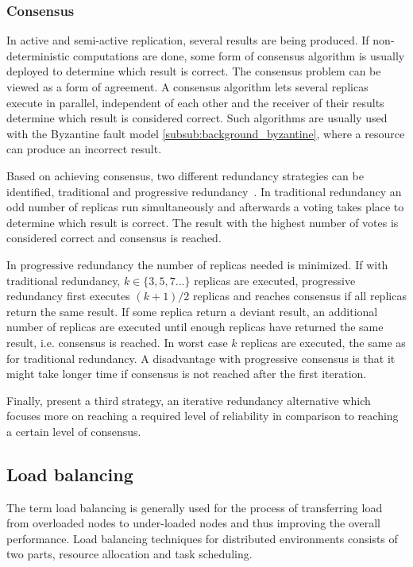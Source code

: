 \documentclass{cslthse-msc}
\begin{document}
\subsubsection{Consensus} \label{subsub:consensus}
In active and semi-active replication, several results are being produced. If non-deterministic computations are done, some form of consensus algorithm is usually deployed to determine which result is correct. The consensus problem can be viewed as a form of agreement. A consensus algorithm lets several replicas execute in parallel, independent of each other and the receiver of their results determine which result is considered correct. Such algorithms are usually used with the Byzantine fault model \cref{subsub:background_byzantine}, where a resource can produce an incorrect result.

Based on achieving consensus, two different redundancy strategies can be identified, traditional and progressive redundancy~\cite{selfAdaptRel}. In traditional redundancy an odd number of replicas run simultaneously and afterwards a voting takes place to determine which result is correct. The result with the highest number of votes is considered correct and consensus is reached.

In progressive redundancy the number of replicas needed is minimized. If with traditional redundancy, $k \in \{3,5,7...\}$ replicas are executed, progressive redundancy first executes $(k+1)/2$ replicas and reaches consensus if all replicas return the same result. If some replica return a deviant result, an additional number of replicas are executed until enough replicas have returned the same result, i.e. consensus is reached. In worst case $k$ replicas are executed, the same as for traditional redundancy. A disadvantage with progressive consensus is that it might take longer time if consensus is not reached after the first iteration.

Finally, \cite{selfAdaptRel} present a third strategy, an iterative redundancy alternative which focuses more on reaching a required level of reliability in comparison to reaching a certain level of consensus.

\subsection{Load balancing} \label{sec:background_load_balancing}
The term load balancing is generally used for the process of transferring load from overloaded nodes to under-loaded nodes and thus improving the overall performance. Load balancing techniques for distributed environments consists of two parts, resource allocation and task scheduling. 
\end{document}
